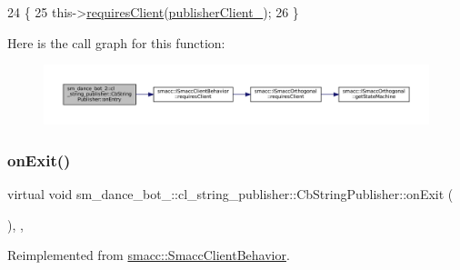 \begin{DoxyCode}
24     \{
25         this->\hyperlink{classsmacc_1_1ISmaccClientBehavior_a32b16e99e3b4cb289414203dc861a440}{requiresClient}(\hyperlink{classsm__dance__bot__2_1_1cl__string__publisher_1_1CbStringPublisher_a374db0f8b7ae20321f38c611108cb49a}{publisherClient\_});
26     \}
\end{DoxyCode}
Here is the call graph for this function\+:
\nopagebreak
\begin{figure}[H]
\begin{center}
\leavevmode
\includegraphics[width=350pt]{classsm__dance__bot__2_1_1cl__string__publisher_1_1CbStringPublisher_abc3c362ea55110f8d340e5cb4d901892_cgraph}
\end{center}
\end{figure}
\mbox{\label{classsm__dance__bot__2_1_1cl__string__publisher_1_1CbStringPublisher_aee990acdb5ec33f1d22efafbe32216f2}} 
\subsubsection{\texorpdfstring{on\+Exit()}{onExit()}}
{\footnotesize\ttfamily virtual void sm\+\_\+dance\+\_\+bot\+\_\+::cl\+\_\+string\+\_\+publisher\+::\+Cb\+String\+Publisher\+::on\+Exit (\begin{DoxyParamCaption}{ }\end{DoxyParamCaption})\hspace{0.3cm}{\ttfamily [inline]}, {\ttfamily [override]}, {\ttfamily [virtual]}}



Reimplemented from \hyperlink{classsmacc_1_1SmaccClientBehavior_a7e4fb6ce81ff96dc172425852d69c0c5}{smacc\+::\+Smacc\+Client\+Behavior}.



